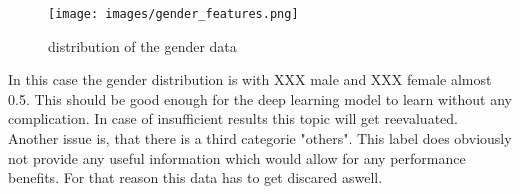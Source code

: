     \begin{figure}[h] %
        \centering %
	    \texttt{[image: images/gender\_features.png]}
        \caption{distribution of the gender data} %
        \label{fig:gender_distribution} %
    \end{figure}


    In this case the gender distribution is with XXX male and XXX female almost 0.5. This should be good enough for the deep learning model to learn without any complication. In case of insufficient results this topic will get reevaluated. Another issue is, that there is a third categorie "others". This label does obviously not provide any useful information which would allow for any performance benefits. For that reason this data has to get discared aswell.
